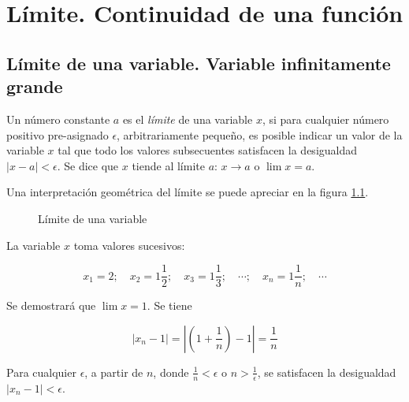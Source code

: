 \chapter{Límite. Continuidad de una función} \label{c:limcont}


\section{Límite de una variable. Variable infinitamente grande}

\begin{definition} 
  Un número constante $a$ es el \emph{límite} de una variable $x$, si para cualquier número positivo pre-asignado $\epsilon$, arbitrariamente pequeño, es posible indicar un valor de la variable $x$ tal que todo los valores subsecuentes satisfacen la desigualdad $|x - a| < \epsilon$.
  Se dice que $x$ tiende al límite $a$: $x \to a$ o $\lim x = a$.
\end{definition}

Una interpretación geométrica del límite se puede apreciar en la figura \ref{c:limcont:vlimdef}.

\begin{figure}
  \centering


  \caption{Límite de una variable}
  \label{c:limcont:vlimdef}
\end{figure}

\begin{example}
  La variable $x$ toma valores sucesivos:

  $$x_1 = 2;\quad x_2 = 1 \frac{1}{2};\quad x_3 = 1 \frac{1}{3};\quad
  \cdots;\quad x_n = 1 \frac{1}{n};\quad \cdots$$

  Se demostrará que $\lim x = 1$. Se tiene

  $$|x_n - 1| = \left| \left(1 + \frac{1}{n}\right) - 1 \right| = \frac{1}{n}$$

  Para cualquier $\epsilon$, a partir de $n$, donde $\frac{1}{n} < \epsilon$ o $n > \frac{1}{\epsilon}$, se satisfacen la desigualdad $|x_n - 1| < \epsilon$.
\end{example}

